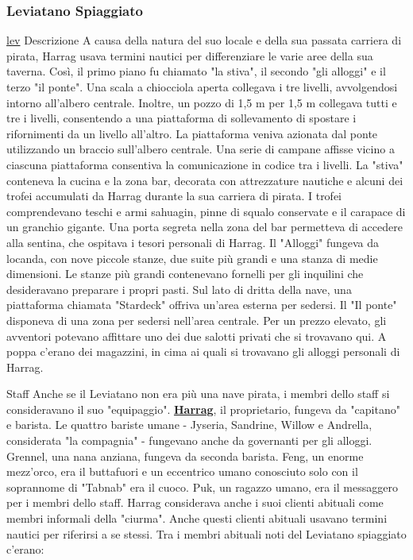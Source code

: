 \documentclass{article}
\begin{document}
\subsubsection{Leviatano Spiaggiato}
\hyperlink{leviatano}{lev}
Descrizione\newline
A causa della natura del suo locale e della sua passata carriera di pirata, Harrag usava termini nautici per differenziare le varie aree della sua taverna. Così, il primo piano fu chiamato "la stiva", il secondo "gli alloggi" e il terzo "il ponte". Una scala a chiocciola aperta collegava i tre livelli, avvolgendosi intorno all'albero centrale. Inoltre, un pozzo di 1,5 m per 1,5 m  collegava tutti e tre i livelli, consentendo a una piattaforma di sollevamento di spostare i rifornimenti da un livello all'altro. La piattaforma veniva azionata dal ponte utilizzando un braccio sull'albero centrale. Una serie di campane affisse vicino a ciascuna piattaforma consentiva la comunicazione in codice tra i livelli.\newline
La "stiva" conteneva la cucina e la zona bar, decorata con attrezzature nautiche e alcuni dei trofei accumulati da Harrag durante la sua carriera di pirata. I trofei comprendevano teschi e armi sahuagin, pinne di squalo conservate e il carapace di un granchio gigante. Una porta segreta nella zona del bar permetteva di accedere alla sentina, che ospitava i tesori personali di Harrag.\newline
Il "Alloggi" fungeva da locanda, con nove piccole stanze, due suite più grandi e una stanza di medie dimensioni. Le stanze più grandi contenevano fornelli per gli inquilini che desideravano preparare i propri pasti. Sul lato di dritta della nave, una piattaforma chiamata "Stardeck" offriva un'area esterna per sedersi.\newline
Il "Il ponte" disponeva di una zona per sedersi nell'area centrale. Per un prezzo elevato, gli avventori potevano affittare uno dei due salotti privati che si trovavano qui. A poppa c'erano dei magazzini, in cima ai quali si trovavano gli alloggi personali di Harrag.

Staff\newline
Anche se il Leviatano non era più una nave pirata, i membri dello staff si consideravano il suo "equipaggio". \hyperlink{harrag}{\textbf{Harrag}}, il proprietario, fungeva da "capitano" e barista. Le quattro bariste umane - Jyseria, Sandrine, Willow e Andrella, considerata "la compagnia" - fungevano anche da governanti per gli alloggi. Grennel, una nana anziana, fungeva da seconda barista. Feng, un enorme mezz'orco, era il buttafuori e un eccentrico umano conosciuto solo con il soprannome di "Tabnab" era il cuoco. Puk, un ragazzo umano, era il messaggero per i membri dello staff. Harrag considerava anche i suoi clienti abituali come membri informali della "ciurma". Anche questi clienti abituali usavano termini nautici per riferirsi a se stessi. Tra i membri abituali noti del Leviatano spiaggiato c'erano:
\end{document}
